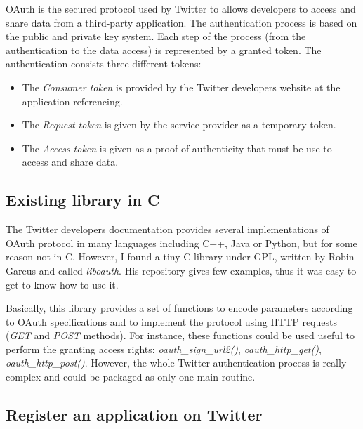 \clearpage

OAuth is the secured protocol used by Twitter to allows developers to access and share data from a third-party application. The authentication process is based on the public and private key system. Each step of the process (from the authentication to the data access) is represented by a granted token. The authentication consists three different tokens:
\begin{itemize}
\item The \textit{Consumer token} is provided by the Twitter developers website at the application referencing.
\item The \textit{Request token} is given by the service provider as a temporary token.
\item The \textit{Access token} is given as a proof of authenticity that must be use to access and share data.
\end{itemize}


\subsection{Existing library in C}


\hspace{15mm}The Twitter developers documentation provides several implementations of OAuth protocol in many languages including C++, Java or Python, but for some reason not in C. However, I found a tiny C library under GPL, written by Robin Gareus and called \textit{liboauth}. His repository gives few examples, thus it was easy to get to know how to use it.

Basically, this library provides a set of functions to encode parameters according to OAuth specifications and to implement the protocol using HTTP requests (\textit{GET} and \textit{POST} methods). For instance, these functions could be used useful to perform the granting access rights: \textit{oauth\_sign\_url2()}, \textit{oauth\_http\_get()}, \textit{oauth\_http\_post()}. However, the whole Twitter authentication process is really complex and could be packaged as only one main routine.


\subsection{Register an application on Twitter}

